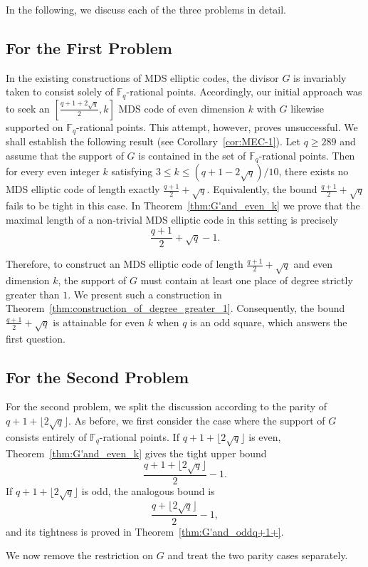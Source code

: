 \documentclass[journal,12pt,onecolumn]{IEEEtran}
\begin{document}
In the following, we discuss each of the three problems in detail.

\subsection{For the First Problem}
In the existing constructions of MDS elliptic codes, the divisor $G$ is invariably taken to consist solely of $\mathbb{F}_q$-rational points. Accordingly, our initial approach was to seek an $[\frac{q+1+2\sqrt{q}}{2},k]$ MDS code of even dimension $k$ with $G$ likewise supported on $\mathbb{F}_q$-rational points. This attempt, however, proves unsuccessful. We shall establish the following result (see Corollary~\ref{cor:MEC-1}). Let $q \ge 289$ and assume that the support of $G$ is contained in the set of $\mathbb{F}_q$-rational points. Then for every even integer $k$ satisfying $3 \le k \le (q+1-2\sqrt{q})/10$, there exists no MDS elliptic code of length exactly $\frac{q+1}{2}+\sqrt{q}$. Equivalently, the bound $\frac{q+1}{2}+\sqrt{q}$ fails to be tight in this case. In Theorem~\ref{thm:G'and_even_k} we prove that the maximal length of a non‑trivial MDS elliptic code in this setting is precisely
\[
\frac{q+1}{2}+\sqrt{q}-1.
\]

Therefore, to construct an MDS elliptic code of length $\frac{q+1}{2}+\sqrt{q}$ and even dimension $k$, the support of $G$ must contain at least one place of degree strictly greater than $1$. We present such a construction in Theorem~\ref{thm:construction_of_degree_greater_1}. Consequently, the bound $\frac{q+1}{2}+\sqrt{q}$ is attainable for even $k$ when $q$ is an odd square, which answers the first question.

\subsection{For the Second Problem}
For the second problem, we split the discussion according to the parity of $q+1+ \lfloor 2\sqrt{q} \rfloor$.
As before, we first consider the case where the support of $G$ consists entirely of $\mathbb{F}_q$-rational points.
If $q+1+ \lfloor 2\sqrt{q} \rfloor$ is even, Theorem~\ref{thm:G'and_even_k} gives the tight upper bound
\[
\frac{q+1+ \lfloor 2\sqrt{q} \rfloor}{2} - 1 .
\]
If $q+1+ \lfloor 2\sqrt{q} \rfloor$ is odd, the analogous bound is
\[
\frac{q+ \lfloor 2\sqrt{q} \rfloor}{2} - 1 ,
\]
and its tightness is proved in Theorem~\ref{thm:G'and_oddq+1+}.

We now remove the restriction on $G$ and treat the two parity cases separately.
\end{document}
